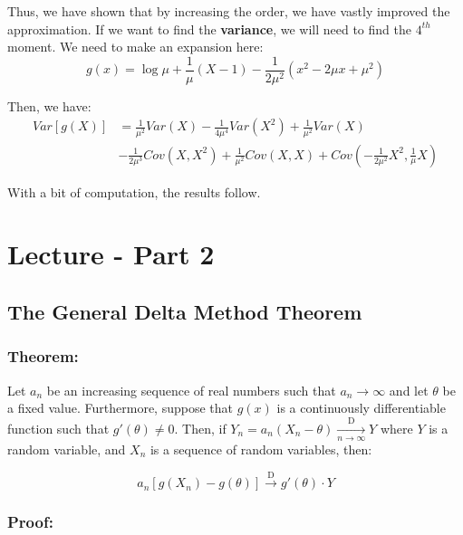 \documentclass{article}
\begin{document}
\begin{enumerate}
    Thus, we have shown that by increasing the order, we have vastly improved the approximation. If we want to find the \textbf{variance}, we will need to find the $4^{th}$ moment. We need to make an expansion here:
    \begin{equation*}
        g(x) = \log \mu + \frac{1}{\mu} (X-1) - \frac{1}{2\mu^2}(x^2-2\mu x + \mu^2)
    \end{equation*}
    
    Then, we have:
    \begin{equation*}
        \begin{split}
            Var[g(X)] &= \frac{1}{\mu^2} Var(X) - \frac{1}{4\mu^4} Var(X^2) + \frac{1}{\mu^2}Var(X)\\
            &- \frac{1}{2\mu^3}Cov(X,X^2) + \frac{1}{\mu^2}Cov(X,X) + Cov\left(-\frac{1}{2\mu^2}X^2,\frac{1}{\mu}X\right)
        \end{split}
    \end{equation*}
    
    With a bit of computation, the results follow.
    
\end{enumerate}
    
    \section{Lecture - Part 2}
    \subsection{The General Delta Method Theorem}
    \subsubsection*{Theorem:}
    
    Let $a_n$ be an increasing sequence of real numbers such that $a_n \to \infty$ and let $\theta$ be a fixed value. Furthermore, suppose that $g(x)$ is a continuously differentiable function such that $g'(\theta) \neq 0$. Then, if $Y_n = a_n(X_n-\theta) \xrightarrow[n\to\infty]{\text{D}} Y$ where $Y$ is a random variable, and $X_n$ is a sequence of random variables, then:
    
    \begin{equation*}
        a_n\left[g(X_n)-g(\theta) \right] \xrightarrow{\text{D}} g'(\theta)\cdot Y
    \end{equation*}
    
    \subsubsection*{Proof:}
    
\end{document}

